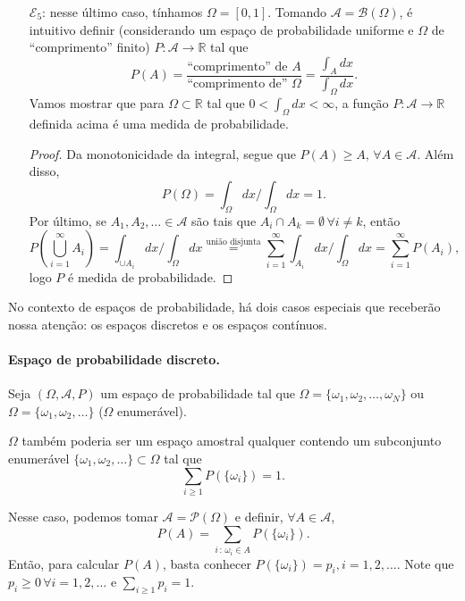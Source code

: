 \documentclass[../Notas.tex]{subfiles}
\begin{document}
\begin{example}
\begin{itemize}
\begin{proof}
$$    $$
    logo $P$ é medida de probabilidade.
    \end{proof}
    \item[$\mathcal{E}_5$:] nesse último caso, tínhamos $\Omega = [0,1]$. Tomando $\mathcal{A} = \mathcal{B}(\Omega)$, é intuitivo definir (considerando um espaço de probabilidade uniforme e $\Omega$ de ``comprimento'' finito) $P:\mathcal{A}\to\mathbb{R}$ tal que
    $$
    P(A) = \frac{ \text{``comprimento'' de $A$} }{ \text{``comprimento de'' $\Omega$} } = \frac{ \int_{A}dx }{ \int_{\Omega}dx }.
    $$
    Vamos mostrar que para $\Omega\subset\mathbb{R}$ tal que $\displaystyle{ 0 < \int_{\Omega} dx < \infty }$, a função $P:\mathcal{A} \to \mathbb{R}$ definida acima é uma medida de probabilidade.
    \begin{proof}
    Da monotonicidade da integral, segue que $P(A)\geq A, \, \forall A\in\mathcal{A}$. Além disso, 
    $$
    P(\Omega) = \int_{\Omega}dx/\int_{\Omega}dx = 1.
    $$
    Por último, se $A_1, A_2, \dots \in\mathcal{A}$ são tais que $A_i\cap A_k = \emptyset \, \forall i\neq k$, então
    $$
    P\left( \bigcup_{i=1}^{\infty}A_i \right) = 
    \int_{\cup A_i} dx / \int_{\Omega} dx \stackrel{\text{união disjunta}}{=} \sum_{i=1}^{\infty} \int_{A_i} dx / \int_{\Omega} dx = \sum_{i=1}^{\infty}P(A_i),
    $$
    logo $P$ é medida de probabilidade.
    \end{proof}
\end{itemize}
\end{example}

No contexto de espaços de probabilidade, há dois casos especiais que receberão nossa atenção: os espaços discretos e os espaços contínuos.

\paragraph{Espaço de probabilidade discreto.}
Seja $(\Omega, \mathcal{A}, P)$ um espaço de probabilidade tal que $\Omega = \{ \omega_1, \omega_2, \dots, \omega_N \}$ ou $\Omega = \{ \omega_1, \omega_2, \dots \}$ ($\Omega$ enumerável).

\begin{remark}
$\Omega$ também poderia ser um espaço amostral qualquer contendo um subconjunto enumerável $\{ \omega_1, \omega_2, \dots \}\subset\Omega$ tal que
$$
\sum_{i\geq 1}P(\{ \omega_i \}) = 1.
$$
\end{remark}

Nesse caso, podemos tomar $\mathcal{A} = \mathcal{P}(\Omega)$ e definir, $\forall A\in\mathcal{A}$,
$$
P(A) = \sum_{i \, : \, \omega_i\in A}P(\{ \omega_i \}).
$$
Então, para calcular $P(A)$, basta conhecer $P(\{ \omega_i \}) = p_i, i = 1,2,\dots$. Note que $p_i\geq 0 \, \forall i=1,2,\dots$ e $\displaystyle{\sum_{i\geq 1}p_i = 1}$.
\end{document}
